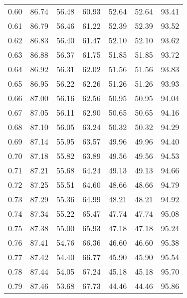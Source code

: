 \begin{tabular}{|c|c|c|c|c|c|c|}
      0.60 &     86.74 &     56.48 &      60.93 &   52.64 &      52.64 &         93.41 \\
      0.61 &     86.79 &     56.46 &      61.22 &   52.39 &      52.39 &         93.52 \\
      0.62 &     86.83 &     56.40 &      61.47 &   52.10 &      52.10 &         93.62 \\
      0.63 &     86.88 &     56.37 &      61.75 &   51.85 &      51.85 &         93.72 \\
      0.64 &     86.92 &     56.31 &      62.02 &   51.56 &      51.56 &         93.83 \\
      0.65 &     86.95 &     56.22 &      62.26 &   51.26 &      51.26 &         93.93 \\
      0.66 &     87.00 &     56.16 &      62.56 &   50.95 &      50.95 &         94.04 \\
      0.67 &     87.05 &     56.11 &      62.90 &   50.65 &      50.65 &         94.16 \\
      0.68 &     87.10 &     56.05 &      63.24 &   50.32 &      50.32 &         94.29 \\
      0.69 &     87.14 &     55.95 &      63.57 &   49.96 &      49.96 &         94.40 \\
      0.70 &     87.18 &     55.82 &      63.89 &   49.56 &      49.56 &         94.53 \\
      0.71 &     87.21 &     55.68 &      64.24 &   49.13 &      49.13 &         94.66 \\
      0.72 &     87.25 &     55.51 &      64.60 &   48.66 &      48.66 &         94.79 \\
      0.73 &     87.29 &     55.36 &      64.99 &   48.21 &      48.21 &         94.92 \\
      0.74 &     87.34 &     55.22 &      65.47 &   47.74 &      47.74 &         95.08 \\
      0.75 &     87.38 &     55.00 &      65.93 &   47.18 &      47.18 &         95.24 \\
      0.76 &     87.41 &     54.76 &      66.36 &   46.60 &      46.60 &         95.38 \\
      0.77 &     87.42 &     54.40 &      66.77 &   45.90 &      45.90 &         95.54 \\
      0.78 &     87.44 &     54.05 &      67.24 &   45.18 &      45.18 &         95.70 \\
      0.79 &     87.46 &     53.68 &      67.73 &   44.46 &      44.46 &         95.86 \\

\end{tabular}
